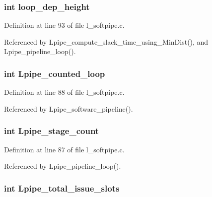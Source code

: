 \subsubsection{\setlength{\rightskip}{0pt plus 5cm}int \bf{loop\_\-dep\_\-height}}\label{l__softpipe__int_8h_4dc68702d9b52f9ccb3dc704c3382dad}




Definition at line 93 of file l\_\-softpipe.c.

Referenced by Lpipe\_\-compute\_\-slack\_\-time\_\-using\_\-Min\-Dist(), and Lpipe\_\-pipeline\_\-loop().
\subsubsection{\setlength{\rightskip}{0pt plus 5cm}int \bf{Lpipe\_\-counted\_\-loop}}\label{l__softpipe__int_8h_e41610bb03edbaeb7c02cfcc7fc4467b}




Definition at line 88 of file l\_\-softpipe.c.

Referenced by Lpipe\_\-software\_\-pipeline().
\subsubsection{\setlength{\rightskip}{0pt plus 5cm}int \bf{Lpipe\_\-stage\_\-count}}\label{l__softpipe__int_8h_e9b3310fa8a82cd6903c833cef98effd}




Definition at line 87 of file l\_\-softpipe.c.

Referenced by Lpipe\_\-pipeline\_\-loop().
\subsubsection{\setlength{\rightskip}{0pt plus 5cm}int \bf{Lpipe\_\-total\_\-issue\_\-slots}}\label{l__softpipe__int_8h_377860f550eb8f35543d1b7c4a931268}





